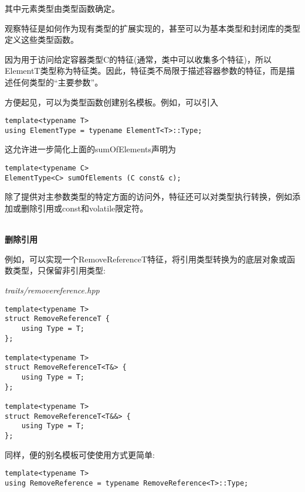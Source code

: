 其中元素类型由类型函数确定。

观察特征是如何作为现有类型的扩展实现的，甚至可以为基本类型和封闭库的类型定义这些类型函数。

因为用于访问给定容器类型C的特征(通常，类中可以收集多个特征)，所以ElementT类型称为特征类。因此，特征类不局限于描述容器参数的特征，而是描述任何类型的“主要参数”。

方便起见，可以为类型函数创建别名模板。例如，可以引入

\begin{lstlisting}[style=styleCXX]
template<typename T>
using ElementType = typename ElementT<T>::Type;
\end{lstlisting}

这允许进一步简化上面的sumOfElements声明为

\begin{lstlisting}[style=styleCXX]
template<typename C>
ElementType<C> sumOfElements (C const& c);
\end{lstlisting}



除了提供对主参数类型的特定方面的访问外，特征还可以对类型执行转换，例如添加或删除引用或const和volatile限定符。

\hspace*{\fill} \\ %
\noindent
\textbf{删除引用}

例如，可以实现一个RemoveReferenceT特征，将引用类型转换为的底层对象或函数类型，只保留非引用类型:

\noindent
\textit{traits/removereference.hpp}
\begin{lstlisting}[style=styleCXX]
template<typename T>
struct RemoveReferenceT {
	using Type = T;
};

template<typename T>
struct RemoveReferenceT<T&> {
	using Type = T;
};

template<typename T>
struct RemoveReferenceT<T&&> {
	using Type = T;
};
\end{lstlisting}

同样，便的别名模板可使使用方式更简单:

\begin{lstlisting}[style=styleCXX]
template<typename T>
using RemoveReference = typename RemoveReference<T>::Type;
\end{lstlisting}

